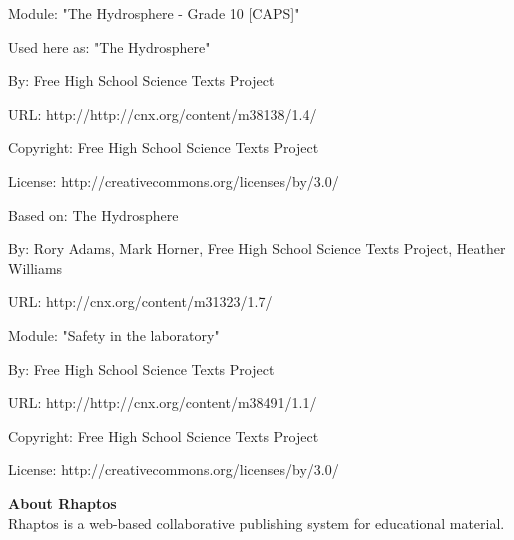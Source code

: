       \par\vspace{9pt}\noindent\begin{minipage}{\textwidth}
      Module: "The Hydrosphere - Grade 10 [CAPS]" \par\nopagebreak\noindent
      Used here as: "The Hydrosphere" \par\nopagebreak\noindent
        By: Free High School Science Texts Project\par\nopagebreak\noindent
      URL: http://http://cnx.org/content/m38138/1.4/\par\nopagebreak\noindent
      \par\nopagebreak\noindent
      Copyright: Free High School Science Texts Project\par\nopagebreak\noindent
      License:  http://creativecommons.org/licenses/by/3.0/\par\nopagebreak\noindent
      Based on: The Hydrosphere\par\nopagebreak\noindent
        By: Rory Adams, Mark Horner, Free High School Science Texts Project, Heather Williams\par\nopagebreak\noindent
        URL: http://cnx.org/content/m31323/1.7/
        \par\end{minipage}
      \par\vspace{9pt}\noindent\begin{minipage}{\textwidth}
      Module: "Safety in the laboratory" \par\nopagebreak\noindent
      By: Free High School Science Texts Project\par\nopagebreak\noindent
      URL: http://http://cnx.org/content/m38491/1.1/\par\nopagebreak\noindent
      \par\nopagebreak\noindent
      Copyright: Free High School Science Texts Project\par\nopagebreak\noindent
      License:  http://creativecommons.org/licenses/by/3.0/\par\nopagebreak\noindent
      \par\end{minipage}
      
    \newpage 
    \pagestyle{empty}
    \def\leftmark{}
    \def\rightmark{}
    \noindent
    

    \noindent\textbf{About Rhaptos} \\
    
Rhaptos is a web-based collaborative publishing system for educational material.
      
    
  
